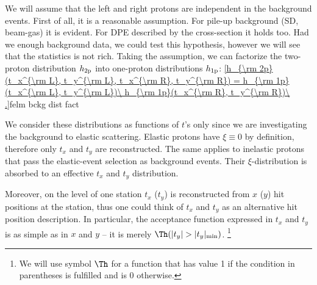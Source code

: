

We will assume that the left and right protons are independent in the background events. First of all, it is a reasonable assumption. For pile-up background (SD, beam-gas) it is evident. For DPE described by the cross-section  it holds too. Had we enough background data, we could test this hypothesis, however we will see that the statistics is not rich. Taking the assumption, we can factorize the two-proton distribution $h_{\rm 2p}$ into one-proton distributions $h_{\rm 1p}$:
\eqref{h_{\rm 2p}(t_x^{\rm L}, t_y^{\rm L}, t_x^{\rm R}, t_y^{\rm R}) = h_{\rm 1p}(t_x^{\rm L}, t_y^{\rm L})\ h_{\rm 1p}(t_x^{\rm R}, t_y^{\rm R})\ .}{felm bckg dist fact}

We consider these distributions as functions of $t$'s only since we are investigating the background to elastic scattering. Elastic protons have $\xi\equiv 0$ by definition, therefore only $t_x$ and $t_y$ are reconstructed. The same applies to inelastic protons that pass the elastic-event selection as background events. Their $\xi$-distribution is absorbed to an effective $t_x$ and $t_y$ distribution.

Moreover, on the level of one station $t_x$ ($t_y$) is reconstructed from $x$ ($y$) hit positions at the station, thus one could think of $t_x$ and $t_y$ as an alternative hit position description. In particular, the acceptance function expressed in $t_x$ and $t_y$ is as simple as in $x$ and $y$ -- it is merely $\Th(|t_y| > |t_y|_{\rm min})$. \footnote{%
We will use symbol $\Th$ for a function that has value 1 if the condition in parentheses is fulfilled and is 0 otherwise.
}

\bmfig
{}
\emfig

